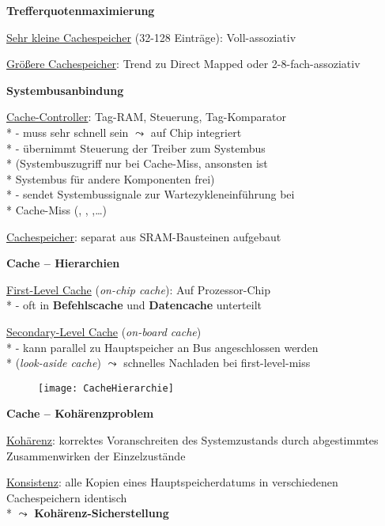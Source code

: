 \textbf{Trefferquotenmaximierung}
\begin{items}
	\item \underline{Sehr kleine Cachespeicher} (32-128 Einträge): Voll-assoziativ
	\item \underline{Größere Cachespeicher}: Trend zu Direct Mapped oder 2-8-fach-assoziativ
\end{items}

\textbf{Systembusanbindung}
\begin{items}
	\item \underline{Cache-Controller}: Tag-RAM, Steuerung, Tag-Komparator \\*
		- muss sehr schnell sein \( \leadsto \) auf Chip integriert \\*
		- übernimmt Steuerung der Treiber zum Systembus \\* \phantom{-} (Systembuszugriff nur bei Cache-Miss, ansonsten ist \\* \phantom{-} Systembus für andere Komponenten frei) \\*
		- sendet Systembussignale zur Wartezykleneinführung bei \\* \phantom{-} Cache-Miss (, , ,\dots)
	\item \underline{Cachespeicher}: separat aus SRAM-Bausteinen aufgebaut
\end{items}

\textbf{Cache -- Hierarchien}
\begin{items}
	\item \underline{First-Level Cache} (\emph{on-chip cache}): Auf Prozessor-Chip \\*
		- oft in \textbf{Befehlscache} und \textbf{Datencache} unterteilt
	\item \underline{Secondary-Level Cache} (\emph{on-board cache}) \\*
		- kann parallel zu Hauptspeicher an Bus angeschlossen werden \\* \phantom{-} (\emph{look-aside cache}) \( \leadsto \) schnelles Nachladen bei first-level-miss
\end{items}
\begin{figure}[H]\centering\label{CacheHierarchie}\texttt{[image: CacheHierarchie]}\end{figure}

\textbf{Cache -- Kohärenzproblem}
\begin{items}
	\item \underline{Kohärenz}: korrektes Voranschreiten des Systemzustands durch abgestimmtes Zusammenwirken der Einzelzustände
	\item \underline{Konsistenz}: alle Kopien eines Hauptspeicherdatums in verschiedenen Cachespeichern identisch \\* \( \leadsto \) \textbf{Kohärenz-Sicherstellung}
\end{items}

